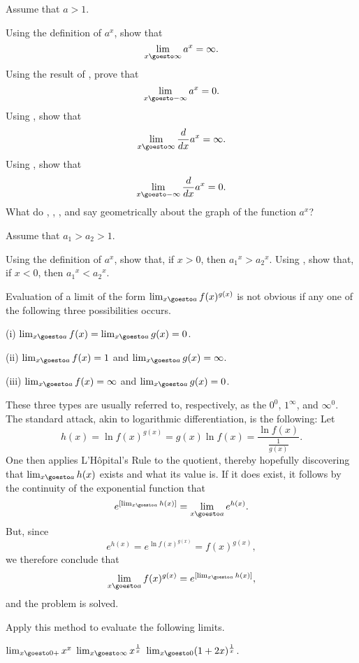 \begin{exercises}
Assume that $a  > 1$.
\begin{exenum}
\x
{}
Using the definition of $a^x$, show that
\[
\lim_{x\goesto\infty} a^x = \infty
.
\]
\x
{}
Using the result of , prove that
\[
\lim_{x\goesto-\infty} a^x = 0
.
\]
\x
{}
Using , show that
\[
\lim_{x\goesto\infty} \frac{d}{dx} a^x = \infty
.
\]
\x
{}
Using , show that
\[
\lim_{x\goesto-\infty} \frac{d}{dx} a^x = 0
.
\]
\x
What do , , ,
and  say geometrically about the graph
of the function $a^x$?
\end{exenum}

Assume that $a_1 > a_2 > 1$.
\begin{exenum}
\x
{}
Using the definition of $a^x$,
show that, if $x > 0$, then ${a_1}^x > {a_2}^x$.
\x
Using , show that, if $x < 0$,
then ${a_1}^x < {a_2}^x$.
\end{exenum}

Evaluation of a limit of the form
$\lim_{x\goesto a} f(x)^{g(x)}$
is not obvious if any one of the following
three possibilities occurs.

(i) \quad $\lim_{x\goesto a} f(x) = \lim_{x\goesto a} g(x) = 0$.

(ii) \quad $\lim_{x\goesto a} f(x) = 1$ and
$\lim_{x\goesto a} g(x) = \infty$.

(iii) \quad $\lim_{x\goesto a} f(x) = \infty$ and
$\lim_{x\goesto a} g(x) = 0$.

These three types are usually referred to,
respectively, as the 
$0^0$, $1^\infty$, and $\infty^0$.
The standard attack, akin to logarithmic differentiation,
is the following:  Let
\[
h(x) = \ln f(x)^{g(x)} = g(x) \ln f(x) =
\frac{\ln f(x)}{\frac1{g(x)}}
.
\]
One then applies L'H\^opital's Rule to the quotient,
thereby hopefully discovering that
$\lim_{x\goesto a} h(x)$ exists and what its value is.
If it does exist, it follows by the continuity
of the exponential function that
\[
e^{\left[ \lim_{x\goesto a} h(x)\right]} =
\lim_{x\goesto a} e^{h(x)}
.
\]
But, since
\[
e^{h(x)} = e^{\ln f(x)^{g(x)}} = f(x)^{g(x)}
,
\]
we therefore conclude that
\[
\lim_{x\goesto a} f(x)^{g(x)} =
e^{\left[ \lim_{x\goesto a} h(x)\right]}
,
\]
and the problem is solved.

Apply this method to evaluate the following limits.
\begin{exenum}
\x
$\lim_{x\goesto0+} x^x$
\x
$\lim_{x\goesto\infty} x^{\frac1x}$
\x
$\lim_{x\goesto0} (1+2x)^{\frac1x}$.
\end{exenum}

\end{exercises}
